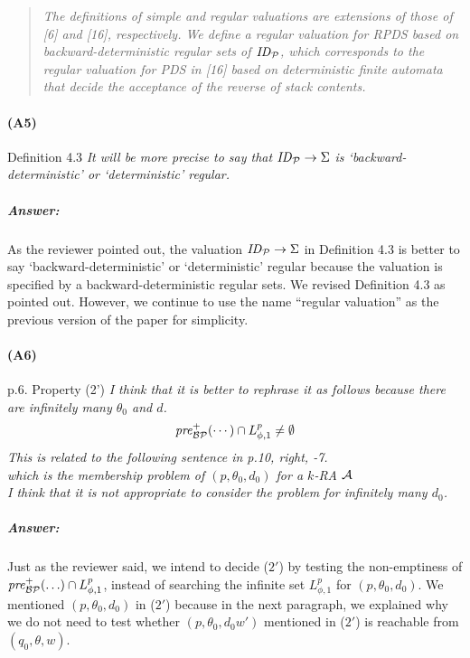 \documentclass{article}
\begin{document}
\begin{quote}\em
	The definitions of simple and regular valuations are extensions of those of [6] and [16], respectively.
	We define a regular valuation for RPDS
	based on backward-deterministic regular sets of $\mathit{ID}_{\cal P}$,
	which corresponds to the regular valuation for PDS in [16]
	based on deterministic finite automata
	that decide the acceptance of the reverse of stack contents.
\end{quote}


\paragraph{(A5)} Definition 4.3 \newline
\textit{
It will be more precise to say that $\mathit{ID}_{\cal P}\to\Sigma$ is `backward-deterministic' or `deterministic'
regular.
}
\subparagraph{Answer:}
As the reviewer pointed out,
the valuation $\mathit{ID}_{\cal P}\to\Sigma$ in Definition 4.3
is better to say `backward-deterministic' or `deterministic' regular
because the valuation is specified by a backward-deterministic regular sets.
We revised Definition 4.3 as pointed out.
However, we continue to use the name ``regular valuation'' as the previous version of the paper for simplicity.

\paragraph{(A6)} p.6. Property (2') \newline
\textit{
I think that it is better to rephrase it as follows because there are infinitely many $\theta_0$ and $d$.
\begin{align*}
\mathit{pre}^+_{{{\cal B}{\cal P}}}(\cdots)\cap L^p_{\phi, 1}\neq \emptyset
\end{align*}
This is related to the following sentence in p.10, right, -7.
\medskip\noindent\\
which is the membership problem of $(p, \theta_0, d_0)$ for a $k$-RA ${\cal A}$
\medskip\noindent\\
I think that it is not appropriate to consider the problem for infinitely many $d_0$.
}
\subparagraph{Answer:}
Just as the reviewer said,
we intend to decide ($2'$) by testing the non-emptiness
of $\mathit{pre}^+_{{{\cal B}{\cal P}}}(\ldots)\cap L_{\phi,1}^p$,
instead of searching
the infinite set $L_{\phi,1}^p$ for $(p,\theta_0,d_0)$.
We mentioned $(p,\theta_0,d_0)$ in ($2'$) because
in the next paragraph, we explained why
we do not need to test whether
$(p,\theta_0,d_0w')$ mentioned in ($2'$) is reachable from
$(q_0,\theta,w)$.
\end{document}
